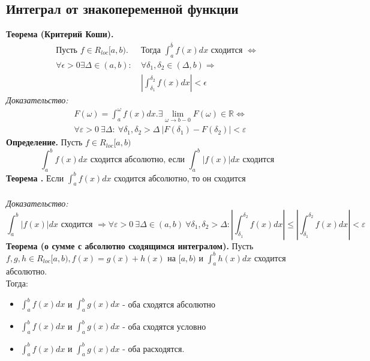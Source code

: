 \documentclass{article}
\newcommand*{\theorem}[2]{\textbf{Теорема #1. } #2 \newline}
\newcommand*{\definition}[1]{\textbf{Определение.} #1 \newline}
\newcommand*{\R}{\mathbb{R}}
\begin{document}
\subsection{Интеграл от знакопеременной функции}
\theorem{(Критерий Коши)}{
    \begin{align*}
        \text{Пусть }f \in R_{loc}[a, b). &\text{Тогда }\int_{a}^{\bar{b}} f(x)dx \text{ сходится } \Leftrightarrow\\
        \forall \epsilon > 0 \exists \Delta \in (a, b):\  &\forall \delta_1, \delta_2 \in (\Delta, b) \Rightarrow\\
        &\left|\int_{\delta_1}^{\delta_2} f(x)dx\right| < \epsilon
    \end{align*}
}
\textit{Доказательство: \\}
\begin{align*}
    &F(\omega) = \int_{a}^{\omega} f(x)dx. \exists \displaystyle \lim_{\omega \to b - 0} F(\omega) \in \R \Leftrightarrow\\
    &\forall \varepsilon > 0\ \exists \Delta:\ \forall \delta_1, \delta_2 > \Delta\ |F(\delta_1) - F(\delta_2)| < \varepsilon
\end{align*}
\definition{Пусть $f \in R_{loc}[a, b)$
    $$
        \int_{a}^{b} f(x)dx \text{ сходится абсолютно, если } \int_{a}^{b} |f(x)|dx \text{ сходится}
    $$
}
\theorem{}{}
Если $\int_{a}^{b} f(x)dx$ сходится абсолютно, то он сходится\\\\
\textit{Доказательство: }
$$
    \int_{a}^{b}|f(x)|dx \text{ сходится } \Rightarrow \forall \varepsilon > 0\  \exists \Delta \in (a, b)\ \forall \delta_1, \delta_2 > \Delta: \left|\int_{\delta_1}^{\delta_2}f(x)dx\right| \leq \left|\int_{\delta_1}^{\delta_2} f(x)dx\right| < \varepsilon
$$
\theorem{(о сумме с абсолютно сходящимся интегралом)}{}
Пусть $f, g, h \in R_{loc}[a, b), f(x) = g(x) + h(x)$ на $[a, b)$ и $\int_{a}^{b}h(x)dx$ сходится абсолютно.\\ 
Тогда:
\begin{itemize}
    \item $\int_{a}^{b}f(x)dx$ и $\int_{a}^{b}g(x)dx$ - оба сходятся абсолютно\\
    \item $\int_{a}^{b}f(x)dx$ и $\int_{a}^{b}g(x)dx$ - оба сходятся условно\\
    \item $\int_{a}^{b}f(x)dx$ и $\int_{a}^{b}g(x)dx$ - оба расходятся.\\\\
\end{itemize}
\end{document}
